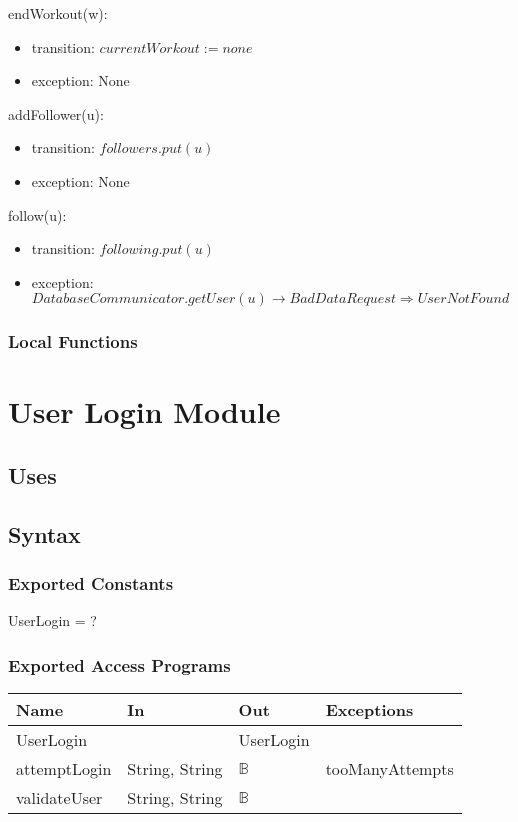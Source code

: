 \documentclass[12pt, titlepage]{article}
\begin{document}
\noindent endWorkout(w):
\begin{itemize}
	\item transition: $ currentWorkout := none $
	\item exception: None
\end{itemize}

\noindent addFollower(u):
\begin{itemize}
	\item transition: $ followers.put(u) $
	\item exception: None
\end{itemize}

\noindent follow(u):
\begin{itemize}
	\item transition: $ following.put(u) $
	\item exception: $DatabaseCommunicator.getUser(u) \rightarrow BadDataRequest \Rightarrow UserNotFound$
\end{itemize}

\subsubsection{Local Functions}

\newpage

\section{User Login Module}

\subsection{Uses}

\subsection{Syntax}

\subsubsection{Exported Constants}
UserLogin = ?
\subsubsection{Exported Access Programs}

\begin{center}
	\begin{tabular}{p{2cm} p{4cm} p{4cm} p{2cm}}
		\hline
		\textbf{Name} & \textbf{In} & \textbf{Out} & \textbf{Exceptions} \\
		\hline
		UserLogin & & UserLogin &  \\
		attemptLogin & String, String & $\mathbb{B}$ & tooManyAttempts \\
		validateUser & String, String & $\mathbb{B}$ &  \\
		\hline
	\end{tabular}
\end{center}
\end{document}

